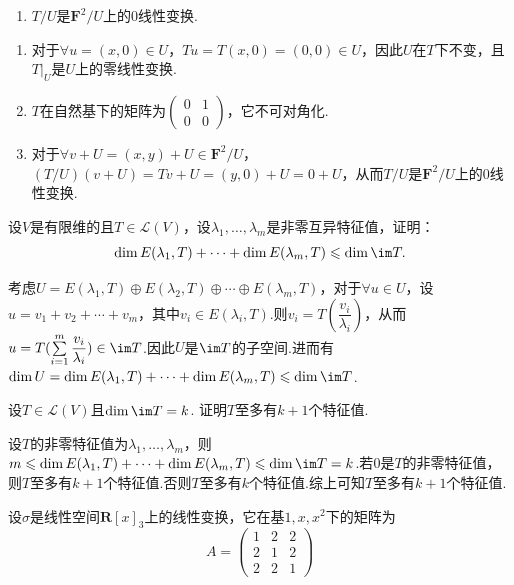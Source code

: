 \begin{exercise}
\begin{exgroup}
\begin{enumerate}
            \item $T/U$是$\mathbf{F}^2/U$上的0线性变换.
        \end{enumerate}
        \begin{answer}
            \begin{enumerate}
                \item 对于$\forall u=(x,0)\in U$，$Tu=T(x,0)=(0,0)\in U$，因此$U$在$T$下不变，且$T|_{U}$是$U$上的零线性变换.
                \item $T$在自然基下的矩阵为$\begin{pmatrix}
                    0 & 1 \\ 0 & 0
                \end{pmatrix}$，它不可对角化.
                \item 对于$\forall v+U=(x,y)+U\in \mathbf{F}^2/U$，$(T/U)(v+U)=Tv+U=(y,0)+U=0+U$，从而$T/U$是$\mathbf{F}^2/U$上的$0$线性变换.
            \end{enumerate}
        \end{answer}
        \item 设$V$是有限维的且$T\in \mathcal{L}(V)$，设$\lambda_1,\ldots,\lambda_m$是非零互异特征值，证明：
        \[ \dim E(\lambda_1,T)+\cdots+\dim E(\lambda_m,T)\leqslant\dim\im T. \]
        \begin{answer}
            考虑$U=E(\lambda_1,T)\oplus E(\lambda_2,T) \oplus \cdots \oplus E(\lambda_m,T)$，对于$\forall u\in U$，设$u=v_1+v_2+\cdots+v_m$，其中$v_i\in E(\lambda_i,T)$.则$v_i=T(\dfrac{v_i}{\lambda_i})$，从而$u=T(\sum\limits_{i=1}^{m}\dfrac{v_i}{\lambda_i}) \in \im T$.因此$U$是$\im T$的子空间.进而有$\dim U=\dim E(\lambda_1,T)+\cdots+\dim E(\lambda_m,T) \leqslant \dim \im T$.
        \end{answer}
        \item 设$T\in \mathcal{L}(V)$且$\dim\im T=k$. 证明$T$至多有$k+1$个特征值.
        \begin{answer}
            设$T$的非零特征值为$\lambda_1,\ldots,\lambda_m$，则$m\leqslant \dim E(\lambda_1,T)+\cdots+\dim E(\lambda_m,T)\leqslant \dim\im T=k$.若$0$是$T$的非零特征值，则$T$至多有$k+1$个特征值.否则$T$至多有$k$个特征值.综上可知$T$至多有$k+1$个特征值.
        \end{answer}
        \item 设$\sigma$是线性空间$\mathbf{R}[x]_3$上的线性变换，它在基$1,x,x^2$下的矩阵为
        \[ A=\begin{pmatrix}
                1 & 2 & 2 \\ 2 & 1 & 2 \\ 2 & 2 & 1

\end{pmatrix}\]
\end{exgroup}
\end{exercise}
